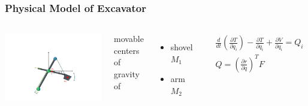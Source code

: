 \begin{frame}
	\frametitle{Physical Model of Excavator}
	\begin{columns}
		\centering
		\includegraphics[trim=30cm 5cm 30cm 23cm, clip=true, width=\linewidth]{img/Excavator_mass2}
		
		movable centers of gravity of
		\begin{itemize}
			\item{shovel $M_1$}
			\item{arm $M_2$}\\
		\end{itemize}
		
		\begin{small}
			\begin{align*}
				&\frac{d}{dt}\left(\frac{\partial T}{\partial \dot{q}_i}\right) -
				\frac{\partial T}{\partial q_i} +
				\frac{\partial V}{\partial q_i}
				= Q_i \\
				& Q = \left(\frac{\partial r}{\partial q}\right)^T F\\
			\end{align*}
		\end{small}
	\end{columns}
	
	
\end{frame}

